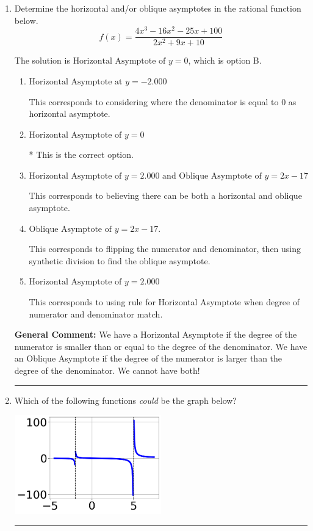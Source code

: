 \documentclass{extbook}[14pt]
\newcommand{\litem}[1]{\item #1

\rule{\textwidth}{0.4pt}}
\begin{document}
\begin{enumerate}\litem{
Determine the horizontal and/or oblique asymptotes in the rational function below.
\[ f(x) = \frac{4x^{3} -16 x^{2} -25 x + 100}{2x^{2} +9 x + 10} \]

The solution is \( \text{Horizontal Asymptote of } y = 0 \), which is option B.\begin{enumerate}[label=\Alph*.]
\item \( \text{Horizontal Asymptote at } y = -2.000 \)

This corresponds to considering where the denominator is equal to 0 as horizontal asymptote.
\item \( \text{Horizontal Asymptote of } y = 0 \)

* This is the correct option.
\item \( \text{Horizontal Asymptote of } y = 2.000 \text{ and Oblique Asymptote of } y = 2x -17 \)

This corresponds to believing there can be both a horizontal and oblique asymptote.
\item \( \text{Oblique Asymptote of } y = 2x -17. \)

This corresponds to flipping the numerator and denominator, then using synthetic division to find the oblique asymptote.
\item \( \text{Horizontal Asymptote of } y = 2.000  \)

This corresponds to using rule for Horizontal Asymptote when degree of numerator and denominator match.
\end{enumerate}

\textbf{General Comment:} We have a Horizontal Asymptote if the degree of the numerator is smaller than or equal to the degree of the denominator. We have an Oblique Asymptote if the degree of the numerator is larger than the degree of the denominator. We cannot have both!
}
\litem{
Which of the following functions \textit{could} be the graph below?

\begin{center}
    \includegraphics[width=0.5\textwidth]{../Figures/identifyGraphOfRationalFunctionCopyB.png}
\end{center}




}
\end{enumerate}
\end{document}
